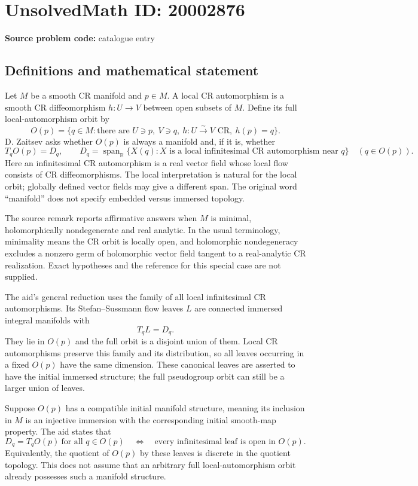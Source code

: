 \documentclass[11pt]{article}
\newcommand{\R}{\mathbb{R}}
\begin{document}
\section*{UnsolvedMath ID: 20002876}
\textbf{Source problem code:} catalogue entry
\subsection{Definitions and mathematical statement}
Let $M$ be a smooth CR manifold and $p\in M$. A local CR automorphism is a smooth CR diffeomorphism $h:U\to V$ between open subsets of $M$. Define its full local-automorphism orbit by
\[
O(p)=\{q\in M:\text{there are }U\ni p,\ V\ni q,\ h:U\overset{\sim}{\longrightarrow}V\text{ CR},\ h(p)=q\}.
\]
D. Zaitsev asks whether $O(p)$ is always a manifold and, if it is, whether
\[
T_qO(p)=D_q,\qquad
D_q=\operatorname{span}_{\R}\{X(q):X\text{ is a local infinitesimal CR automorphism near }q\}
\quad(q\in O(p)).
\]
Here an infinitesimal CR automorphism is a real vector field whose local flow consists of CR diffeomorphisms. The local interpretation is natural for the local orbit; globally defined vector fields may give a different span. The original word ``manifold'' does not specify embedded versus immersed topology.

The source remark reports affirmative answers when $M$ is minimal, holomorphically nondegenerate and real analytic. In the usual terminology, minimality means the CR orbit is locally open, and holomorphic nondegeneracy excludes a nonzero germ of holomorphic vector field tangent to a real-analytic CR realization. Exact hypotheses and the reference for this special case are not supplied.

The aid's general reduction uses the family of all local infinitesimal CR automorphisms. Its Stefan--Sussmann flow leaves $L$ are connected immersed integral manifolds with
\[
T_qL=D_q.
\]
They lie in $O(p)$ and the full orbit is a disjoint union of them. Local CR automorphisms preserve this family and its distribution, so all leaves occurring in a fixed $O(p)$ have the same dimension. These canonical leaves are asserted to have the initial immersed structure; the full pseudogroup orbit can still be a larger union of leaves.

Suppose $O(p)$ has a compatible initial manifold structure, meaning its inclusion in $M$ is an injective immersion with the corresponding initial smooth-map property. The aid states that
\[
D_q=T_qO(p)\ \text{for all }q\in O(p)
\quad\Longleftrightarrow\quad
\text{every infinitesimal leaf is open in }O(p).
\]
Equivalently, the quotient of $O(p)$ by these leaves is discrete in the quotient topology. This does not assume that an arbitrary full local-automorphism orbit already possesses such a manifold structure.
\end{document}
